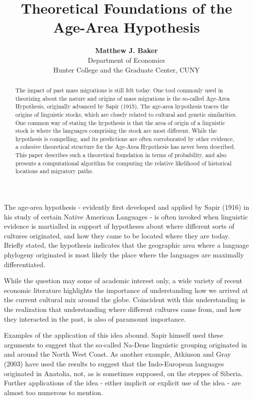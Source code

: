 \documentclass[11pt]{article}
\title{Theoretical Foundations of the Age-Area Hypothesis}
\author{\textbf{Matthew J. Baker} \\ Department of Economics \\ Hunter College and the Graduate Center, CUNY}
\begin{document}
\maketitle
\begin{abstract}
\noindent The impact of past mass migrations is still felt today. One tool commonly used in theorizing about the nature and origins of mass migrations is the so-called Age-Area Hypothesis, originally advanced by Sapir (1915). The age-area hypothesis traces the origins of linguistic stocks, which are closely related to cultural and genetic similarities. One common way of stating the hypothesis
is that the area of origin of a linguistic stock is where the languages comprising the stock are most different. While the hypothesis is compelling, and its predictions are often corroborated by other evidence, a cohesive theoretical structure for the Age-Area Hypothesis has never been described. This paper describes such a theoretical foundation in terms of probability, and also presents a computational algorithm for computing the relative likelihood of historical locations and migratory paths.
\end{abstract}
\newpage

The age-area hypothesis - evidently first developed and applied by Sapir (1916) in his study of certain Native American Languages - is often invoked when linguistic
evidence is martialled in support of hypotheses about where different sorts of cultures originated, and how they came to be located where they are today. Briefly stated, the hypothesis indicates that the geographic area where a language phylogeny originated is most likely the place where the languages are maximally differentiated.

While the question may some of academic interest only, a wide variety of recent economic literature highlights the importance of understanding how we arrived at the current cultural mix around the globe. Coincident with this understanding is the realization that understanding where different cultures came from, and how they interacted in the past, is also of paramount importance.

Examples of the application of this idea abound. Sapir himself used these arguments to suggest that the so-called Na-Dene linguistic grouping originated in and around the North West Coast. As another example, Atkinson and Gray (2003) have used the results to suggest that the Indo-European languages originated in Anatolia, not, as is sometimes supposed, on the steppes of Siberia. Further applications of the idea - either implicit or explicit use of the idea - are almost too numerous to mention.
\end{document}

